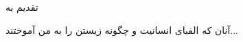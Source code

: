 \begin{acknowledgementpage}

\vspace{1.5cm}

{\nastaliq
{
	تقدیم به
	
 آنان که الفبای انسانیت و چگونه زیستن را به من آموختند...
}}\end{acknowledgementpage}
\newpage